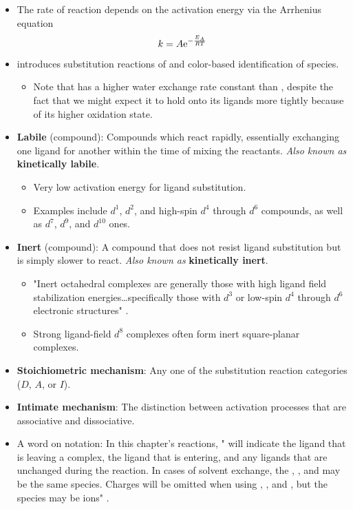 \documentclass[../notes.tex]{subfiles}
\begin{document}
\begin{itemize}
    \item The rate of reaction depends on the activation energy via the Arrhenius equation
    \begin{equation*}
        k = A\e[-\frac{E_A}{RT}]
    \end{equation*}
    \item \textcite{bib:MiesslerFischerTarr} introduces substitution reactions of  and color-based identification of species.
    \begin{itemize}
        \item Note that  has a higher water exchange rate constant than , despite the fact that we might expect it to hold onto its ligands more tightly because of its higher oxidation state.
    \end{itemize}
    \item \textbf{Labile} (compound): Compounds which react rapidly, essentially exchanging one ligand for another within the time of mixing the reactants. \emph{Also known as} \textbf{kinetically labile}.
    \begin{itemize}
        \item Very low activation energy for ligand substitution.
        \item Examples include $d^1$, $d^2$, and high-spin $d^4$ through $d^6$ compounds, as well as $d^7$, $d^9$, and $d^{10}$ ones.
    \end{itemize}
    \item \textbf{Inert} (compound): A compound that does not resist ligand substitution but is simply slower to react. \emph{Also known as} \textbf{kinetically inert}.
    \begin{itemize}
        \item "Inert octahedral complexes are generally those with high ligand field stabilization energies\dots specifically those with $d^3$ or low-spin $d^4$ through $d^6$ electronic structures" \parencite[440-41]{bib:MiesslerFischerTarr}.
        \item Strong ligand-field $d^8$ complexes often form inert square-planar complexes.
    \end{itemize}
    \item \textbf{Stoichiometric mechanism}: Any one of the substitution reaction categories ($D$, $A$, or $I$).
    \item \textbf{Intimate mechanism}: The distinction between activation processes that are associative and dissociative.
    \item A word on notation: In this chapter's reactions, " will indicate the ligand that is leaving a complex,  the ligand that is entering, and  any ligands that are unchanged during the reaction. In cases of solvent exchange, the , , and  may be the same species. Charges will be omitted when using , , and , but the species may be ions" \parencite[441]{bib:MiesslerFischerTarr}.

\end{itemize}
\end{document}
